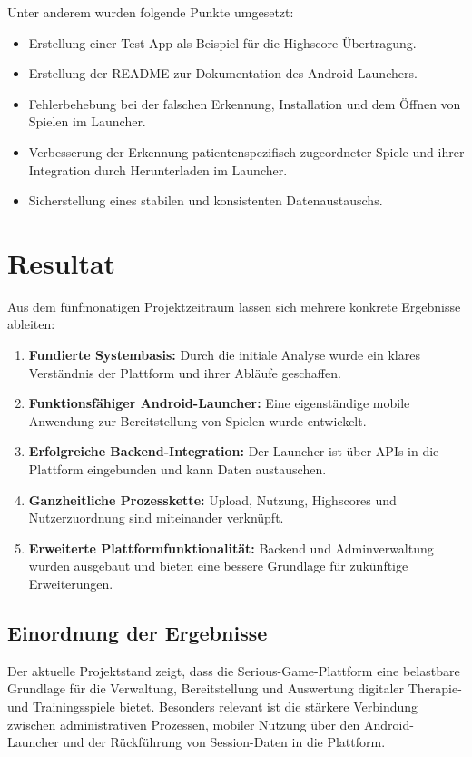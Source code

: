 \documentclass[a4paper,10pt,ngerman]{INSOproject}
\begin{document}
Unter anderem wurden folgende Punkte umgesetzt:
\begin{itemize}
  \item Erstellung einer Test-App als Beispiel für die Highscore-Übertragung.
  \item Erstellung der README zur Dokumentation des Android-Launchers.
  \item Fehlerbehebung bei der falschen Erkennung, Installation und dem Öffnen von Spielen im Launcher.
  \item Verbesserung der Erkennung patientenspezifisch zugeordneter Spiele und ihrer Integration durch Herunterladen im Launcher.
  \item Sicherstellung eines stabilen und konsistenten Datenaustauschs.
\end{itemize}

\section{Resultat}
Aus dem fünfmonatigen Projektzeitraum lassen sich mehrere konkrete Ergebnisse ableiten:

\begin{enumerate}
  \item \textbf{Fundierte Systembasis:} Durch die initiale Analyse wurde ein klares Verständnis der Plattform und ihrer Abläufe geschaffen.
  \item \textbf{Funktionsfähiger Android-Launcher:} Eine eigenständige mobile Anwendung zur Bereitstellung von Spielen wurde entwickelt.
  \item \textbf{Erfolgreiche Backend-Integration:} Der Launcher ist über APIs in die Plattform eingebunden und kann Daten austauschen.
  \item \textbf{Ganzheitliche Prozesskette:} Upload, Nutzung, Highscores und Nutzerzuordnung sind miteinander verknüpft.
  \item \textbf{Erweiterte Plattformfunktionalität:} Backend und Adminverwaltung wurden ausgebaut und bieten eine bessere Grundlage für zukünftige Erweiterungen.
\end{enumerate}

\subsection{Einordnung der Ergebnisse}
Der aktuelle Projektstand zeigt, dass die Serious-Game-Plattform eine belastbare Grundlage für die Verwaltung, Bereitstellung und Auswertung digitaler Therapie- und Trainingsspiele bietet. Besonders relevant ist die stärkere Verbindung zwischen administrativen Prozessen, mobiler Nutzung über den Android-Launcher und der Rückführung von Session-Daten in die Plattform.
\end{document}
